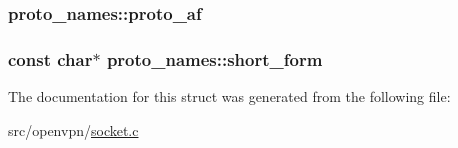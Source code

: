 \subsubsection[{proto\+\_\+af}]{ proto\+\_\+names\+::proto\+\_\+af}\label{structproto__names_acfd7d8fd6a479081780aee59f1d2071d}
\hypertarget{structproto__names_a1ccc0798c13e01b57d2ef508ec9dcae3}{}
\subsubsection[{short\+\_\+form}]{\setlength{\rightskip}{0pt plus 5cm}const char$\ast$ proto\+\_\+names\+::short\+\_\+form}\label{structproto__names_a1ccc0798c13e01b57d2ef508ec9dcae3}


The documentation for this struct was generated from the following file\+:\begin{DoxyCompactItemize}
\item 
src/openvpn/\hyperlink{socket_8c}{socket.\+c}\end{DoxyCompactItemize}
